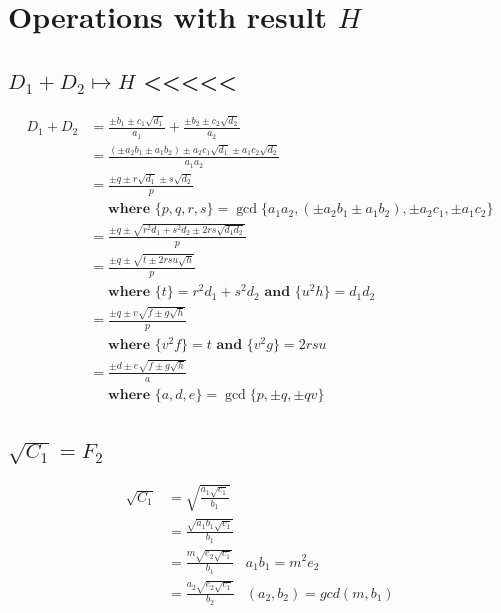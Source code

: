 \documentclass{article}
\begin{document}
\section{Operations with result $H$}

\subsection{$D_1 + D_2 \mapsto H$ <<<<<}
\begin{align}
D_1 + D_2 &= \frac{\pm b_1 \pm c_1\sqrt{d_1}}{a_1} + \frac{\pm b_2 \pm c_2\sqrt{d_2}}{a_2}\\
 &= \frac{(\pm a_2b_1 \pm a_1b_2) \pm a_2c_1\sqrt{d_1} \pm a_1c_2\sqrt{d_2}}{a_1a_2}\\
 &= \frac{\pm q \pm r\sqrt{d_1} \pm s\sqrt{d_2}}{p} \\
 &\quad \textbf{ where } \{ p,q,r,s \} = \gcd \{ a_1a_2, (\pm a_2b_1 \pm a_1b_2), \pm a_2c_1, \pm a_1c_2 \} \nonumber \\
 &= \frac{\pm q \pm \sqrt{r^2d_1 + s^2d_2 \pm 2rs\sqrt{d_1d_2}}}{p} \\
 &= \frac{\pm q \pm \sqrt{t \pm 2rsu\sqrt{h}}}{p} \\
 &\quad \textbf{ where } \{ t \} = r^2d_1 + s^2d_2 \textbf{ and } \{ u^2h \} = d_1d_2 \nonumber \\
 &= \frac{\pm q \pm v\sqrt{f \pm g\sqrt{h}}}{p} \\
 &\quad \textbf{ where } \{ v^2f \} = t \textbf{ and } \{ v^2g \} = 2rsu \nonumber \\
 &= \frac{\pm d \pm e\sqrt{f \pm g\sqrt{h}}}{a} \\
 &\quad \textbf{ where } \{a,d,e\} = \gcd\{ p, \pm q, \pm qv \} \nonumber \\
\end{align}


\subsection{$\sqrt{C_1} = F_2$}
\begin{align*}
\sqrt{C_1} &= \sqrt{\frac{a_1\sqrt{c_1}}{b_1}}\\
 &= \frac{\sqrt{a_1b_1\sqrt{c_1}}}{b_1}     \\
 &= \frac{m\sqrt{e_2\sqrt{c_1}}}{b_1}       & a_1b_1 = m^2e_2\\
 &= \frac{a_2\sqrt{e_2\sqrt{c_1}}}{b_2}     & (a_2,b_2) = gcd(m,b_1)
\end{align*}
\end{document}
